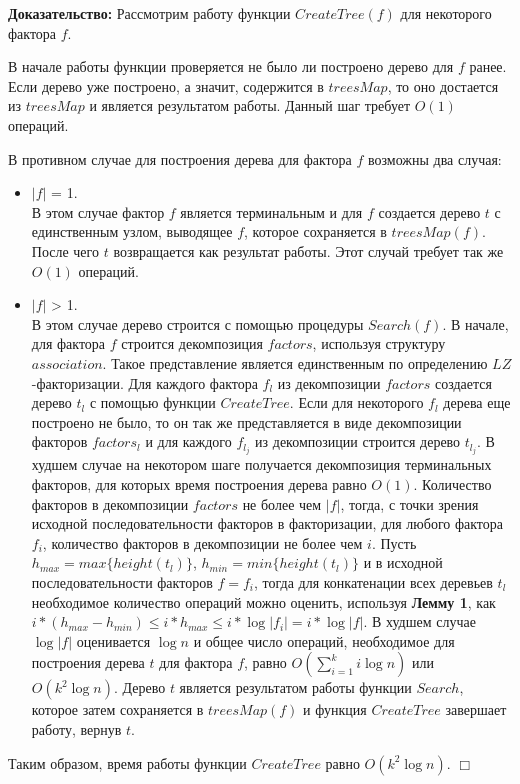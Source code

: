 \documentclass[12pt,a4paper]{extarticle}
\theoremstyle{break}
\begin{document}
\textbf{Доказательство:}  Рассмотрим работу функции $CreateTree(f)$ для
некоторого фактора $f$.

В начале работы функции проверяется не было ли построено дерево для $f$ ранее.
Если дерево уже построено, а значит, содержится в $treesMap$, то оно
достается из $treesMap$ и является результатом работы. Данный шаг требует $O(1)$ операций.

В противном случае для построения дерева для фактора $f$ возможны два случая: 
\begin{itemize}
  \item $|f|$ = 1.\\
В этом случае фактор $f$ является терминальным и для $f$ создается дерево $t$
с единственным узлом, выводящее $f$, которое сохраняется в $treesMap(f)$.
После чего $t$ возвращается как результат работы. Этот случай требует так же $O(1)$ операций.
  \item $|f|$ > 1.\\
В этом случае дерево строится с помощью процедуры $Search(f)$. В начале, для
фактора $f$ строится декомпозиция $factors$, используя структуру $association$.
Такое представление является единственным по определению $LZ$-факторизации. Для
каждого фактора $f_l$ из декомпозиции $factors$ создается дерево $t_l$ с помощью
функции $CreateTree$. Если для некоторого $f_l$ дерева еще
построено не было, то он так же представляется в виде декомпозиции факторов
$factors_l$ и для каждого $f_{l_j}$ из декомпозиции строится дерево $t_{l_j}$. В
худшем случае на некотором шаге получается декомпозиция терминальных факторов,
для которых время построения дерева равно $O(1)$.
Количество факторов в декомпозиции $factors$ не более чем $|f|$, тогда, с точки
зрения исходной последовательности факторов в факторизации, для любого фактора
$f_i$, количество факторов в декомпозиции не более чем $i$. Пусть $h_{max} = max\{height(t_l)\}$,
$h_{min} = min\{height(t_l)\}$ и в исходной последовательности факторов $f =
f_i$, тогда для конкатенации всех деревьев $t_l$ необходимое количество операций
можно оценить, используя \textbf{Лемму 1}, как $i\ast(h_{max}-h_{min}) \leq
i\ast h_{max} \leq i\ast \log |f_i| = i\ast \log |f|$. В худшем случае $\log |f|$
оценивается $\log n$ и общее число операций, необходимое для построения дерева
$t$ для  фактора $f$, равно $O(\sum_{i=1}^k i\log n)$ или $O(k^2\log n)$. Дерево $t$ является
результатом работы функции $Search$, которое затем сохраняется в $treesMap(f)$ и
функция $CreateTree$ завершает работу, вернув $t$.
\end{itemize}
Таким образом, время работы функции $CreateTree$ равно $O(k^2\log n)$. 
$\Box$
\end{document}
